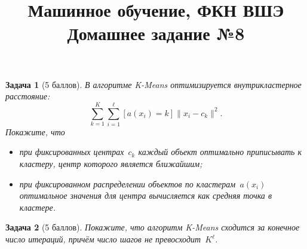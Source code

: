 \documentclass[12pt,fleqn]{article}
\title{Машинное обучение, ФКН ВШЭ\\Домашнее задание №8}
\author{}
\date{}
\newtheorem{esProblem}{Задача}
\begin{document}
\maketitle

\begin{esProblem}[5 баллов]
    В алгоритме K-Means оптимизируется внутрикластерное расстояние:
    \[
        \sum_{k = 1}^{K} \sum_{i = 1}^{\ell}
            [a(x_i) = k]
            \| x_i - c_k \|^2.
    \]
    Покажите, что
    \begin{itemize}
        \item при фиксированных центрах~$c_k$ каждый объект оптимально приписывать к кластеру,
            центр которого является ближайшим;
        \item при фиксированном распределении объектов по кластерам~$a(x_i)$
            оптимальное значения для центра вычисляется как средняя точка в кластере.
    \end{itemize}
\end{esProblem}

\begin{esProblem}[5 баллов]
    Покажите, что алгоритм K-Means сходится за конечное число итераций,
    причём число шагов не превосходит~$K^\ell$.
\end{esProblem}
\end{document}
